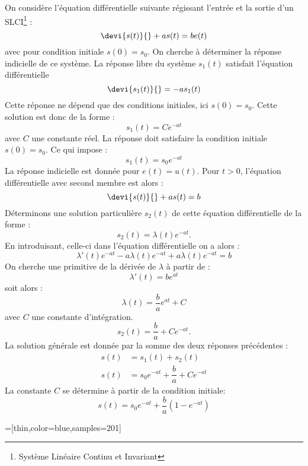 On considère l'équation différentielle suivante régissant l'entrée
et la sortie d'un SLCI\footnote{Système Linéaire Continu et Invariant} :
$$
\devi{s(t)}{}+as(t)=be(t)
$$
avec pour condition initiale $s(0)=s_0$.
On cherche à déterminer la réponse indicielle de ce système.
La réponse libre du système $s_1(t)$ satisfait l'équation différentielle
$$
\devi{s_1(t)}{}=-as_1(t)
$$
Cette réponse ne dépend que des conditions initiales, ici $s(0)=s_0$.
Cette solution est donc de la forme :
$$
s_1(t)=Ce^{-at}
$$
avec $C$ une constante réel. La réponse doit satisfaire la condition 
initiale $s(0)=s_0$. Ce qui impose :
$$
s_1(t)=s_0e^{-at}
$$
La réponse indicielle est donnée pour $e(t)=u(t)$. Pour $t>0$, l'équation 
différentielle avec second membre est alors :
$$
\devi{s(t)}{}+as(t)=b
$$
Déterminons une solution particulière $s_2(t)$ de cette équation 
différentielle de la forme :
$$
s_2(t)=\lambda(t)e^{-at}.
$$
En introduisant, celle-ci dans l'équation différentielle on a alors :
$$
\lambda'(t)e^{-at}-a\lambda(t)e^{-at}+a\lambda(t)e^{-at}=b
$$
On cherche une primitive de la dérivée de $\lambda$ à partir de :
$$
\lambda'(t)=be^{at}
$$
soit alors :
$$
\lambda(t)=\dfrac{b}{a}e^{at}+C
$$
avec $C$ une constante d'intégration.
$$
s_2(t)=\dfrac{b}{a}+Ce^{-at}.
$$
La solution générale est donnée par la somme des deux réponses précédentes :
\begin{align*}
    s(t)&=s_1(t)+s_2(t)\\
    s(t)&=s_0e^{-at}+\dfrac{b}{a}+Ce^{-at}
\end{align*}
La constante $C$ se détermine à partir de la condition initiale:
$$
s(t)=s_0e^{-at}+\dfrac{b}{a}\left(1-e^{-at}\right)
$$
\begin{center}
=[thin,color=blue,samples=201]
\end{center}
